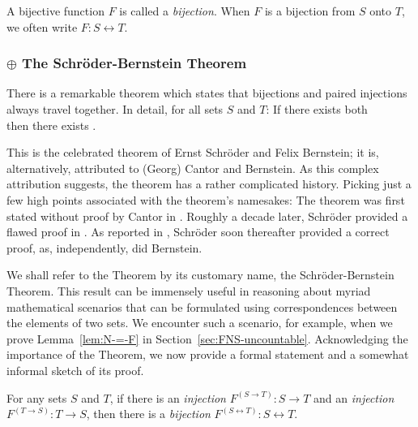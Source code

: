 \begin{enumerate}
A bijective function $F$ is called a {\it bijection}.  When $F$ is a
bijection from $S$ onto $T$, we often write $F: S \leftrightarrow T$.
\end{enumerate}


\subsubsection{$\oplus$ The Schr\"{o}der-Bernstein Theorem}
\label{sec:schroeder-bernstein}

There is a remarkable theorem which states that bijections and paired
injections always travel together.  In detail, for all sets $S$ and $T$:
If there exists both \\
\hspace*{.25in}{\em an injection from $S$ to $T$ and an injection from $T$ to $S$}
then there exists
\hspace*{.25in}{\em a bijection between $\N$ and $\N \times \N$}.


\noindent
This is the celebrated theorem of Ernst Schr\"{o}der and Felix
Bernstein; it is, alternatively, attributed to (Georg) Cantor and
Bernstein.  As this complex attribution suggests, the theorem has a
rather complicated history.  Picking just a few high points associated
with the theorem's namesakes: The theorem was first stated without
proof by Cantor in \cite{Cantor87}.  Roughly a decade later,
Schr\"{o}der provided a flawed proof in \cite{Schroeder98a}.  As
reported in \cite{Deiser2010}, Schr\"{o}der soon thereafter provided a
correct proof, as, independently, did Bernstein.

We shall refer to the Theorem by its customary name, the
Schr\"{o}der-Bernstein Theorem.  This result can be immensely useful
in reasoning about myriad mathematical scenarios that can be
formulated using correspondences between the elements of two sets.  We
encounter such a scenario, for example, when we prove
Lemma~\ref{lem:N-=-F} in Section~\ref{sec:FNS-uncountable}.
Acknowledging the importance of the Theorem, we now provide a formal
statement and a somewhat informal sketch of its proof.

\begin{theorem}
\label{thm.S-B}
For any sets $S$ and $T$, if there is an {\em injection}
$F^{(S \rightarrow T)}: S \rightarrow T$ and an {\em injection}
$F^{(T \rightarrow S)}: T \rightarrow S$,
then there is a {\em bijection}
$F^{(S \leftrightarrow T)}: S \leftrightarrow T$.
\end{theorem}

